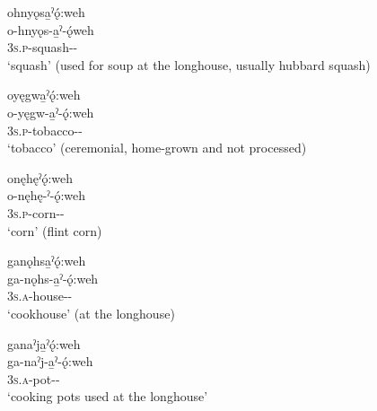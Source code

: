 \ex ohnyǫsa̱ˀǫ́:weh\\
\gll o-hnyǫs-a̱ˀ-ǫ́weh\\
\textsc{3s.p}-squash-{\nsf}-{\typicalizer}\\
\glt ‘squash’ (used for soup at the longhouse, usually hubbard squash)


\ex oyęgwa̱ˀǫ́:weh\\
\gll o-yęgw-a̱ˀ-ǫ́:weh\\
\textsc{3s.p}-tobacco-{\nsf}-{\typicalizer}\\
\glt ‘tobacco’ (ceremonial, home-grown and not processed)


\ex onęhęˀǫ́:weh\\
\gll o-nęhę-ˀ-ǫ́:weh\\
\textsc{3s.p}-corn-{\nsf}-{\typicalizer}\\
\glt ‘corn’ (flint corn)


\ex ganǫhsa̱ˀǫ́:weh\\
\gll ga-nǫhs-a̱ˀ-ǫ́:weh\\
\textsc{3s.a}-house-{\nsf}-{\typicalizer}\\
\glt ‘cookhouse’ (at the longhouse)


\ex ganaˀja̱ˀǫ́:weh\\
\gll ga-naˀj-a̱ˀ-ǫ́:weh\\
 \textsc{3s.a}-pot-{\nsf}-{\typicalizer}\\
\glt `cooking pots used at the longhouse'


